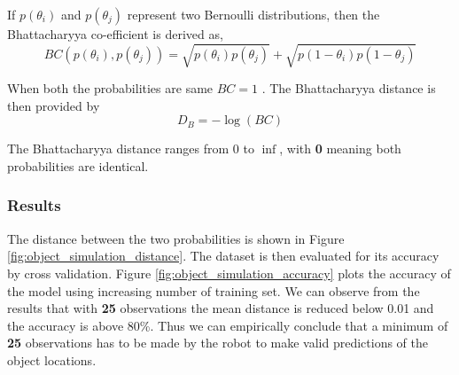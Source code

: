 If $p(\theta_i)$ and $p(\theta_j)$ represent two Bernoulli distributions, then the Bhattacharyya co-efficient is derived as,
\begin{equation}
	BC(p(\theta_i), p(\theta_j)) = \sqrt{p(\theta_i) p(\theta_j)} + \sqrt{p(1- \theta_i) p(1 - \theta_j)}
\end{equation}

When both the probabilities are same $BC = 1$ . The Bhattacharyya distance is then provided by 
\begin{equation}
    D_B = -\log(BC)
\end{equation}

The Bhattacharyya distance ranges from 0 to $\inf$, with \textbf{0} meaning both probabilities are identical. 




\subsubsection*{Results}
The distance between the two probabilities is shown in Figure \ref{fig:object_simulation_distance}. The dataset is then evaluated for its accuracy by cross validation. Figure \ref {fig:object_simulation_accuracy} plots the accuracy of the model using increasing number of training set. We can observe from the results that with \textbf{25} observations the mean distance is reduced below 0.01 and the accuracy is above 80\%. Thus we can empirically conclude that a minimum of \textbf{25} observations has to be made by the robot to make valid predictions of the object locations. 

